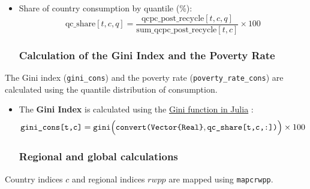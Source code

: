 \documentclass[
]{article}
\begin{document}
\begin{itemize}
\item
  Share of country consumption by quantile (\%):
  \begin{equation}
 \text{qc\_share}[t,c,q] = \frac{\text{qcpc\_post\_recycle}[t,c,q]}{\text{sum\_qcpc\_post\_recycle}[t,c]} \times 100
\end{equation}


\subsubsection{Calculation of the Gini Index and the Poverty Rate}\label{calculation-of-the-gini-index-and-the-poverty-rate}
\end{itemize}

The Gini index (\texttt{gini\_cons}) and the poverty rate
(\texttt{poverty\_rate\_cons}) are calculated using the quantile
distribution of consumption.

\begin{itemize}
\item 
  The \textbf{Gini Index} is calculated using the \href{https://docs.juliahub.com/General/Inequality/stable/library/#Inequality.gini}{Gini function in Julia} :
  \begin{equation}
    \texttt{gini\_cons[t,c]} = \texttt{gini} \Bigl( \texttt{convert(Vector\{Real\}}, \texttt{qc\_share[t,c,:])} \Bigr) \times 100
  \end{equation}


\subsubsection{Regional and global calculations}\label{regional-and-global-calculations}
\end{itemize}

Country indices \(c\) and regional indices \(rwpp\) are mapped using
\texttt{mapcrwpp}.
\end{document}

